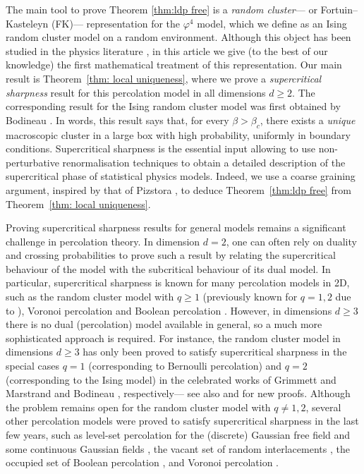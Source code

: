 \documentclass[11pt,a4paper]{article}
\theoremstyle{definition}
\numberwithin{equation}{section}
\begin{document}
The main tool to prove Theorem \ref{thm:ldp free} is a \emph{random cluster}--- or Fortuin--Kasteleyn (FK)--- representation for the $\varphi^4$ model, which we define as an Ising random cluster model on a random environment. Although this object has been studied in the physics literature \cite{brower1989embedded}, in this article we give (to the best of our knowledge) the first mathematical treatment of this representation. Our main result is Theorem~\ref{thm: local uniqueness}, where we prove a \emph{supercritical sharpness} result for this percolation model in all dimensions $d\geq2$. The corresponding result for the Ising random cluster model was first obtained by Bodineau \cite{Bod05}. In words, this result says that, for every $\beta>\beta_c$, there exists a \emph{unique} macroscopic cluster in a large box with high probability, uniformly in boundary conditions. Supercritical sharpness is the essential input allowing to use non-perturbative renormalisation techniques to obtain a detailed description of the supercritical phase of statistical physics models. Indeed, we use a coarse graining argument, inspired by that of Pizstora \cite{Pis96}, to deduce Theorem~\ref{thm:ldp free} from Theorem~\ref{thm: local uniqueness}. 

Proving supercritical sharpness results for general models remains a significant challenge in percolation theory.
In dimension $d=2$, one can often rely on duality and crossing probabilities to prove such a result by relating the supercritical behaviour of the model with the subcritical behaviour of its dual model. 
In particular, supercritical sharpness is known for many percolation models in 2D, such as the random cluster model with $q\geq1$ \cite{BeffaraDuminilSelfDualPoint} (previously known for $q=1,2$ due to \cite{Kesten1980criticalproba,CCS87}), Voronoi percolation \cite{BR06} and Boolean percolation \cite{ATT18}. 
However, in dimensions $d\geq3$ there is no dual (percolation) model available in general, so a much more sophisticated approach is required. For instance, the random cluster model in dimensions $d\geq3$ has only been proved to satisfy supercritical sharpness in the special cases $q=1$ (corresponding to Bernoulli percolation) and $q=2$ (corresponding to the Ising model) in the celebrated works of Grimmett and Marstrand \cite{GM90} and Bodineau \cite{Bod05}, respectively--- see also \cite{CMT24} and \cite{Severo24} for new proofs. Although the problem remains open for the random cluster model with $q\neq 1,2$, several other percolation models were proved to satisfy supercritical sharpness in the last few years, such as level-set percolation for the (discrete) Gaussian free field \cite{DGRS19} and some continuous Gaussian fields \cite{Sev21}, the vacant set of random interlacements \cite{DGRST23a,DGRST23b,DGRST23c}, the occupied set of Boolean percolation \cite{DT22}, and Voronoi percolation \cite{DS23}. 
\end{document}

